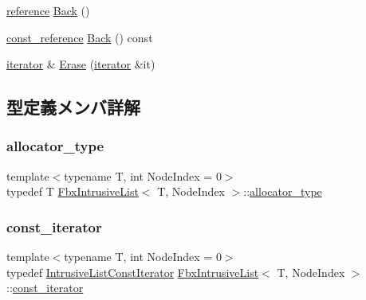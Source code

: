 \begin{DoxyCompactItemize}
\hyperlink{class_fbx_intrusive_list_aa927f048081371fe74dff673d3a5a8ad}{reference} \hyperlink{class_fbx_intrusive_list_a665a77e92b2ff654b2571e1375e7ce25}{Back} ()
\item 
\hyperlink{class_fbx_intrusive_list_a21904cb72c0ccae9d5c0b9f171befeb8}{const\+\_\+reference} \hyperlink{class_fbx_intrusive_list_a80f48fff8dee5d4a6391409a17292c91}{Back} () const
\item 
\hyperlink{class_fbx_intrusive_list_ae1012cd86e3ff0a4a49c982f0d34b4e7}{iterator} \& \hyperlink{class_fbx_intrusive_list_a730189544745e9cb520294375d674b5b}{Erase} (\hyperlink{class_fbx_intrusive_list_ae1012cd86e3ff0a4a49c982f0d34b4e7}{iterator} \&it)
\end{DoxyCompactItemize}


\subsection{型定義メンバ詳解}
\mbox{\label{class_fbx_intrusive_list_a25910b7e87998a2f60ec5762b254bff8}} 
\subsubsection{\texorpdfstring{allocator\+\_\+type}{allocator\_type}}
{\footnotesize\ttfamily template$<$typename T, int Node\+Index = 0$>$ \\
typedef T \hyperlink{class_fbx_intrusive_list}{Fbx\+Intrusive\+List}$<$ T, Node\+Index $>$\+::\hyperlink{class_fbx_intrusive_list_a25910b7e87998a2f60ec5762b254bff8}{allocator\+\_\+type}}

\mbox{\label{class_fbx_intrusive_list_a4c0c567c56a712e7ffca9c6bb5990169}} 
\subsubsection{\texorpdfstring{const\+\_\+iterator}{const\_iterator}}
{\footnotesize\ttfamily template$<$typename T, int Node\+Index = 0$>$ \\
typedef \hyperlink{class_fbx_intrusive_list_1_1_intrusive_list_const_iterator}{Intrusive\+List\+Const\+Iterator} \hyperlink{class_fbx_intrusive_list}{Fbx\+Intrusive\+List}$<$ T, Node\+Index $>$\+::\hyperlink{class_fbx_intrusive_list_a4c0c567c56a712e7ffca9c6bb5990169}{const\+\_\+iterator}}

